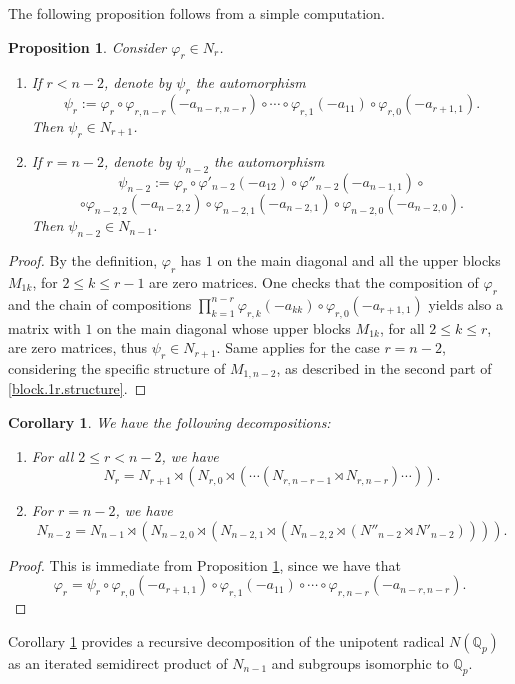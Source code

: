 \documentclass{article}
\newtheorem{proposition2}[theorem2]{Proposition}
\newtheorem{corollary2}[theorem2]{Corollary}
\begin{document}
The following proposition follows from a simple computation.
\begin{proposition2}
\label{prop:psi.automorphism}
Consider $\varphi_{r}\in{N_{r}}$.
\begin{enumerate}
    \item 
If $r<n-2$, denote by $\psi_{r}$ the automorphism \[\psi_{r}:=\varphi_{r}\circ\varphi_{r,n-r}(-a_{n-r,n-r})\circ\cdots\circ\varphi_{r,1}(-a_{11})\circ\varphi_{r,0}(-a_{r+1,1}).\]
Then $\psi_{r}\in{N_{r+1}}$.
    \item 
If $r=n-2$, denote by $\psi_{n-2}$ the automorphism \[\psi_{n-2}:=\varphi_{r}\circ\varphi'_{n-2}(-a_{12})\circ\varphi''_{n-2}(-a_{n-1,1})\circ\]\[\circ\varphi_{n-2,2}(-a_{n-2,2})\circ\varphi_{n-2,1}(-a_{n-2,1})\circ\varphi_{n-2,0}(-a_{n-2,0}).\]
Then $\psi_{n-2}\in{N_{n-1}}$.
\end{enumerate}
\end{proposition2}
\begin{proof}
By the definition, $\varphi_{r}$ has $1$ on the main diagonal and all the upper blocks $M_{1k}$, for $2\leq{k}\leq{r-1}$ are zero matrices. One checks that the composition of $\varphi_{r}$ and the chain of compositions $\prod_{k=1}^{n-r}\varphi_{r,k}(-a_{kk})\circ\varphi_{r,0}(-a_{r+1,1})$ yields also a matrix with $1$ on the main diagonal whose upper blocks $M_{1k}$, for all $2\leq{k}\leq{r}$, are zero matrices, thus $\psi_{r}\in{N_{r+1}}$. Same applies for the case $r=n-2$, considering the specific structure of $M_{1,n-2}$, as described in the second part of \ref{block.1r.structure}.
\end{proof}
\begin{corollary2}
\label{cor:Nr.decomposition}
We have the following decompositions:
\begin{enumerate}
    \item 
For all $2\leq{r}<{n-2}$, we have \[N_{r}=N_{r+1}\rtimes(N_{r,0}\rtimes(\cdots(N_{r,n-r-1}\rtimes{N_{r,n-r}})\cdots)).\]
\item For $r=n-2$, we have 
\[N_{n-2}=N_{n-1}\rtimes({N_{n-2,0}}\rtimes(N_{n-2,1}\rtimes(N_{n-2,2}\rtimes(N''_{n-2}\rtimes{N'_{n-2}})))).\]
\end{enumerate}
\end{corollary2}
\begin{proof}
This is immediate from Proposition \ref{prop:psi.automorphism}, since we have that \[\varphi_{r}=\psi_{r}\circ\varphi_{r,0}(-a_{r+1,1})\circ\varphi_{r,1}(-a_{11})\circ\cdots\circ\varphi_{r,n-r}(-a_{n-r,n-r}).\]
\end{proof}
Corollary \ref{cor:Nr.decomposition} provides a recursive decomposition of the unipotent radical $N(\mathbb{Q}_{p})$ as an iterated semidirect product of $N_{n-1}$ and subgroups isomorphic to $\mathbb{Q}_{p}$.
\end{document}
